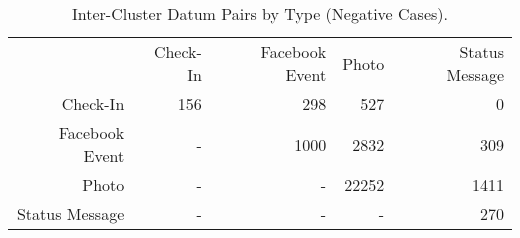 \begin{table}[htp]
	\begin{center}
	\caption{Inter-Cluster Datum Pairs by Type (Negative Cases).}
	\label{tab:table_inter_xtype_cluster}
		\begin{tabular}{r r r r r }
		\toprule
			 & Check-In & Facebook Event & Photo & Status Message\\
			Check-In & 156 & 298 & 527 & 0\\
			Facebook Event & - & 1000 & 2832 & 309\\
			Photo & - & - & 22252 & 1411\\
			Status Message & - & - & - & 270\\
		\bottomrule
		\end{tabular}
	\end{center}
\end{table}